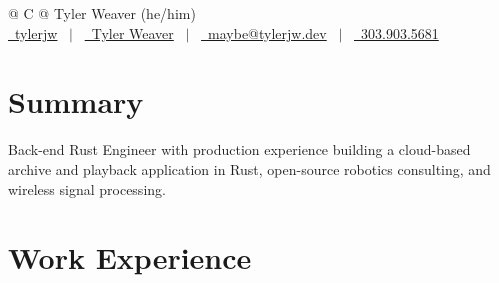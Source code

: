 \documentclass[a4paper,12pt]{article}
\begin{document}
\pagestyle{empty}



\begin{tabularx}{\linewidth}{@{} C @{}}
\Huge{Tyler Weaver (he/him)} \\[7.5pt]
\href{https://github.com/tylerjw}{\raisebox{-0.05\height}\faGithub\ tylerjw} \ $|$ \
\href{https://www.linkedin.com/in/tyler-weaver-b504626}{\raisebox{-0.05\height}\faLinkedin\ Tyler Weaver} \ $|$ \
\href{mailto:maybe@tylerjw.dev}{\raisebox{-0.05\height}\faEnvelope \ maybe@tylerjw.dev} \ $|$ \
\href{tel:+13039035681}{\raisebox{-0.05\height}\faMobile \ 303.903.5681} \\
\end{tabularx}


\section{Summary}
Back-end Rust Engineer with production experience building a cloud-based archive and playback application in Rust, open-source robotics consulting, and wireless signal processing.

\section{Work Experience}
\end{document}
